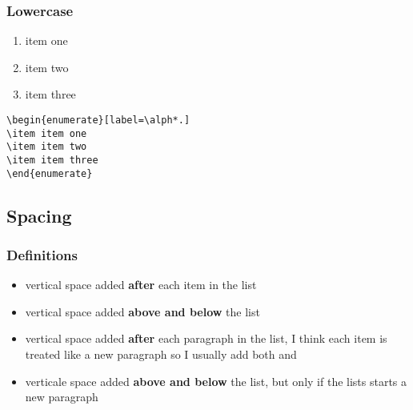 \documentclass[12pt, letterpaper]{article}
\begin{document}
\subsubsection{Lowercase}
\begin{enumerate}[label=\alph*.]
	\item item one 
	\item item two
	\item item three
\end{enumerate}
\begin{lstlisting}
\begin{enumerate}[label=\alph*.]
\item item one 
\item item two
\item item three
\end{enumerate}
\end{lstlisting}

\subsection{Spacing}
\subsubsection{Definitions}
\begin{itemize}
	\item {} vertical space added \textbf{after} each item in the list
	\item {} vertical space added \textbf{above and below} the list 
	\item {} vertical space added \textbf{after} each paragraph in the list, I think each item is treated like a new paragraph so I usually add both  and 
	\item {} verticale space added \textbf{above and below} the list, but only if the lists starts a new paragraph 
\end{itemize}
\end{document}
